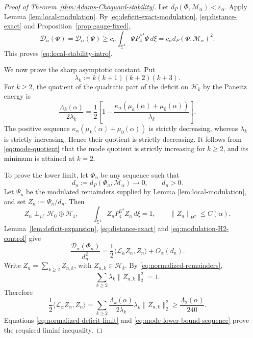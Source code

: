 \documentclass[11pt]{article}
\numberwithin{equation}{section}
\begin{document}
\begin{proof}[Proof of Theorem~\ref{thm:Adams-Choquard-stability}]
Let \(d_{P}(\Phi,\mathcal M_{\alpha})<\varepsilon_{\alpha}\). Apply Lemma
\ref{lem:local-modulation}. By \eqref{eq:deficit-exact-modulation},
\eqref{eq:distance-exact} and Proposition~\ref{prop:gauge-fixed},
\begin{equation*}
\mathcal D_{\alpha}(\Phi)
=\mathcal D_{\alpha}(\Psi)
\geq c_{\alpha}
\int_{\mathbb S^{4}}\Psi P_{4}^{\mathbb S^{4}}\Psi\,d\xi
=c_{\alpha}d_{P}(\Phi,\mathcal M_{\alpha})^{2}.
\end{equation*}
This proves \eqref{eq:local-stability-intro}.

We now prove the sharp asymptotic constant. Put
\begin{equation*}
\lambda_{k}:=k(k+1)(k+2)(k+3).
\end{equation*}
For \(k\geq2\), the quotient of the quadratic part of the deficit on
\(\mathcal H_k\) by the Paneitz energy is
\begin{equation}\label{eq:mode-quotient}
\frac{\Lambda_{k}(\alpha)}{2\lambda_{k}}
=\frac12\left[1-
\frac{\kappa_{\alpha}(\mu_{k}(\alpha)+\mu_{0}(\alpha))}{\lambda_{k}}
\right].
\end{equation}
The positive sequence
\(\kappa_{\alpha}(\mu_k(\alpha)+\mu_0(\alpha))\) is strictly decreasing,
whereas \(\lambda_k\) is strictly increasing. Hence their quotient is
strictly decreasing. It follows from \eqref{eq:mode-quotient} that the mode
quotient is strictly increasing for \(k\geq2\), and its minimum is attained
at \(k=2\).

To prove the lower limit, let \(\Phi_n\) be any sequence such that
\begin{equation*}
d_n:=d_P(\Phi_n,\mathcal M_{\alpha})\longrightarrow0,
\qquad d_n>0.
\end{equation*}
Let \(\Psi_n\) be the modulated remainders supplied by Lemma
\ref{lem:local-modulation}, and set \(Z_n:=\Psi_n/d_n\). Then
\begin{equation}\label{eq:normalized-remainders}
Z_n\perp_{L^{2}}\mathcal H_0\oplus\mathcal H_1,
\qquad
\int_{\mathbb S^{4}}Z_nP_{4}^{\mathbb S^{4}}Z_n\,d\xi=1,
\qquad
\|Z_n\|_{H^{2}}\leq C(\alpha).
\end{equation}
Lemma~\ref{lem:deficit-expansion}, \eqref{eq:distance-exact} and
\eqref{eq:modulation-H2-control} give
\begin{equation}\label{eq:normalized-deficit-limit}
\frac{\mathcal D_{\alpha}(\Phi_n)}{d_n^{2}}
=\frac12\langle\mathcal L_{\alpha}Z_n,Z_n\rangle+O_{\alpha}(d_n).
\end{equation}
Write \(Z_n=\sum_{k\geq2}Z_{n,k}\), with
\(Z_{n,k}\in\mathcal H_k\). By \eqref{eq:normalized-remainders},
\[
\sum_{k\geq2}\lambda_k\|Z_{n,k}\|_{2}^{2}=1.
\]
Therefore
\begin{equation}\label{eq:mode-lower-bound-sequence}
\frac12\langle\mathcal L_{\alpha}Z_n,Z_n\rangle
=\sum_{k\geq2}\frac{\Lambda_k(\alpha)}{2\lambda_k}
\lambda_k\|Z_{n,k}\|_2^{2}
\geq\frac{\Lambda_2(\alpha)}{240}.
\end{equation}
Equations \eqref{eq:normalized-deficit-limit} and
\eqref{eq:mode-lower-bound-sequence} prove the required liminf inequality.


\end{proof}
\end{document}
